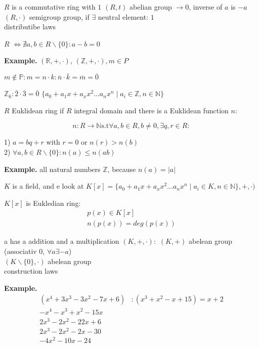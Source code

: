 \begin{definition}
$R$ is a commutative ring with $1$
$(R,t)$ abelian group $\rightarrow 0$, inverse of $a$ is $-a$\\
$(R,\cdot)$ semigroup group, if $\exists$ neutral element: $1$ \\
distributibe laws

$R$  $\iff \nexists a,b \in R \backslash \{0\}: a-b = 0$
\end{definition}

\textbf{Example.}
$(\mathbb{R}, +, \cdot)$, 
$(\mathbb{Z}, + , \cdot), m \in P$

$m\not\in \mathbb{P}: m = n \cdot k : \overline{n} \cdot \overline{k} = \overline{m} = \overline{0}$

$\mathbb{Z}_6 : \overline{2} \cdot \overline{3} = \overline{0}$
$\{a_0 + a_1 x + a_x x^2 \ldots a_n x^n \mid a_i \in \mathbb{Z}, n \in \mathbb{N} \}$

\begin{definition}
$R$ Euklidean ring if $R$ integral domain and there is a Euklidean function $n$:

\[
  n : R \rightarrow \mathbb{N} \text{s.t} \forall a,b \in R, b \neq 0, \exists q,r \in R:
\]

1) $a = bq + r$ with $r = 0$ or $n(r) > n(b)$ \\
2) $\forall a,b \in R \backslash \{0\} : n(a) \leq n(ab)$
\end{definition}

\textbf{Example.}
all natural numbers $\mathbb{Z}$, because $n(a) = |a|$

$K$ is a field, and e look at $K[x] = 
\{a_0 + a_1 x + a_x x^2 \ldots a_n x^n \mid a_i \in K, n \in \mathbb{N} \}
,+, \cdot )$

$K[x]$ is Eukledian ring:
\begin{align*}
  p(x) \in K[x] \\
  n(p(x)) = deg(p(x))
\end{align*}

\begin{definition}
a  has a addition and a multiplication
$(K, +, \cdot):$ 
  $(K,+)$ abelean group (associativ 0, $\forall a \exists -a$) \\
  $(K \backslash \{0\}, \cdot)$ abelean group \\
  construction laws
\end{definition}

\textbf{Example.}
\begin{align*}
  (x^4 + 3x^3 - 3x^2 - 7x + 6) &: ( x^3 + x^2 - x + 15) = x+2 \\
  -x^4 - x^3 + x^2 - 15 x \\
  \hline 
    2x^3 - 2x^2 - 22 x + 6 \\
    2x^3 - 2x^2 - 2 x -30 \\ 
    \hline
      -4x^2 - 10 x - 24
\end{align*}

